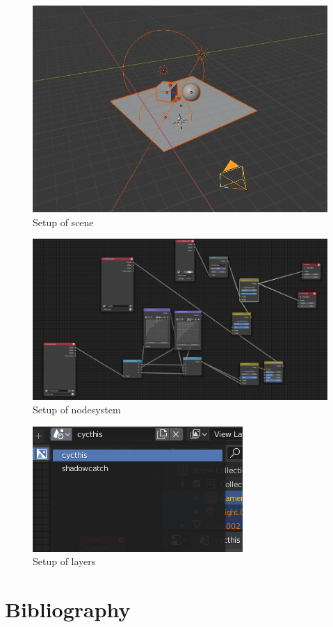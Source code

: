 \documentclass{article}
\begin{document}
\begin{figure}[H]
	\centering
	\includegraphics[width=\textwidth]{img/scene_setup.png}
	\caption{Setup of scene}
	\label{fig:scene_setup}
\end{figure}

\begin{figure}[H]
	\centering
	\includegraphics[width=\textwidth]{img/node_setup.png}
	\caption{Setup of nodesystem}
	\label{fig:node_setup}
\end{figure}

\begin{figure}[H]
	\centering
	\includegraphics[width=\textwidth]{img/layer_setup.png}
	\caption{Setup of layers}
	\label{fig:shadow_setup}
\end{figure}


\section{Bibliography}
\printbibliography
\end{document}
